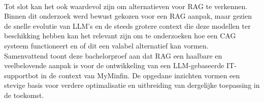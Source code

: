 \\[1em]
Tot slot kan het ook waardevol zijn om alternatieven voor RAG te verkennen. Binnen dit onderzoek werd bewust gekozen voor een RAG aanpak, maar gezien de snelle evolutie van LLM's en de steeds grotere context die deze modellen ter beschikking hebben kan het relevant zijn om te onderzoeken hoe een CAG systeem functioneert en of dit een valabel alternatief kan vormen.
\\[1em]
Samenvattend toont deze bachelorproef aan dat RAG een haalbare en veelbelovende aanpak is voor de ontwikkeling van een LLM-gebaseerde IT-supportbot in de context van MyMinfin. De opgedane inzichten vormen een stevige basis voor verdere optimalisatie en uitbreiding van dergelijke toepassing in de toekomst.